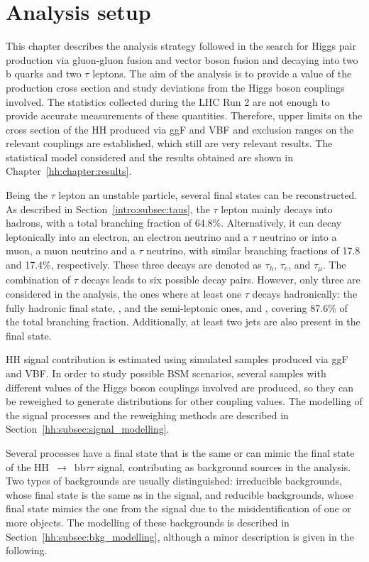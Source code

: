 \documentclass[../main.tex]{subfiles}
\begin{document}
\chapter{Analysis setup}
\label{hh:chapter:analysis}

This chapter describes the analysis strategy followed in the search for Higgs pair production via gluon-gluon fusion and vector boson fusion and decaying into two b quarks and two $\tau$ leptons. The aim of the analysis is to provide a value of the production cross section and study deviations from the Higgs boson couplings involved. The statistics collected during the LHC Run 2 are not enough to provide accurate measurements of these quantities. Therefore, upper limits on the cross section of the HH produced via ggF and VBF and exclusion ranges on the relevant couplings are established, which still are very relevant results. The statistical model considered and the results obtained are shown in Chapter~\ref{hh:chapter:results}.

Being the $\tau$ lepton an unstable particle, several final states can be reconstructed. As described in Section~\ref{intro:subsec:taus}, the $\tau$ lepton mainly decays into hadrons, with a total branching fraction of 64.8\%. Alternatively, it can decay leptonically into an electron, an electron neutrino and a $\tau$ neutrino or into a muon, a muon neutrino and a $\tau$ neutrino, with similar branching fractions of 17.8 and 17.4\%, respectively. These three decays are denoted as $\tau_h$, $\tau_e$, and $\tau_\mu$. The combination of $\tau$ decays leads to six possible decay pairs. However, only three are considered in the analysis, the ones where at least one $\tau$ decays hadronically: the fully hadronic final state, \tauh\tauh{}, and the semi-leptonic ones, \taue\tauh{} and \taumu\tauh, covering 87.6\% of the total branching fraction. Additionally, at least two jets are also present in the final state.

HH signal contribution is estimated using simulated samples produced via ggF and VBF. In order to study possible BSM scenarios, several samples with different values of the Higgs boson couplings involved are produced, so they can be reweighed to generate distributions for other coupling values. The modelling of the signal processes and the reweighing methods are described in Section~\ref{hh:subsec:signal_modelling}.

Several processes have a final state that is the same or can mimic the final state of the HH~$\to$~bb$\tau\tau$ signal, contributing as background sources in the analysis. Two types of backgrounds are usually distinguished: irreducible backgrounds, whose final state is the same as in the signal, and reducible backgrounds, whose final state mimics the one from the signal due to the misidentification of one or more objects. The modelling of these backgrounds is described in Section~\ref{hh:subsec:bkg_modelling}, although a minor description is given in the following.
\end{document}
